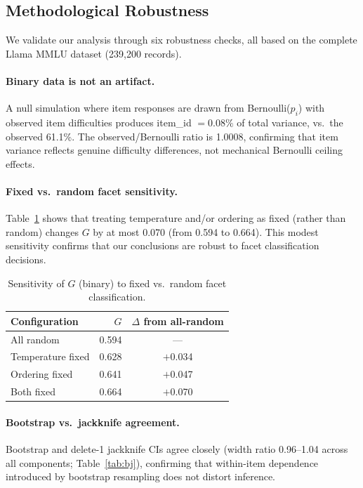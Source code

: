 \documentclass[letterpaper]{article}
\begin{document}
\subsection{Methodological Robustness}
\label{sec:robust}

We validate our analysis through six robustness checks, all based on the complete Llama MMLU dataset (239,200 records).

\paragraph{Binary data is not an artifact.}
A null simulation where item responses are drawn from Bernoulli($p_i$) with observed item difficulties produces item\_id $= 0.08\%$ of total variance, vs.\ the observed 61.1\%. The observed/Bernoulli ratio is 1.0008, confirming that item variance reflects genuine difficulty differences, not mechanical Bernoulli ceiling effects.

\paragraph{Fixed vs.\ random facet sensitivity.}
Table~\ref{tab:fixedrandom} shows that treating temperature and/or ordering as fixed (rather than random) changes $G$ by at most 0.070 (from 0.594 to 0.664). This modest sensitivity confirms that our conclusions are robust to facet classification decisions.

\begin{table}[t]
\centering
\caption{Sensitivity of $G$ (binary) to fixed vs.\ random facet classification.}
\label{tab:fixedrandom}
\small
\begin{tabular}{lrc}
\toprule
Configuration & $G$ & $\Delta$ from all-random \\
\midrule
All random & 0.594 & --- \\
Temperature fixed & 0.628 & $+$0.034 \\
Ordering fixed & 0.641 & $+$0.047 \\
Both fixed & 0.664 & $+$0.070 \\
\bottomrule
\end{tabular}
\end{table}

\paragraph{Bootstrap vs.\ jackknife agreement.}
Bootstrap and delete-1 jackknife CIs agree closely (width ratio 0.96--1.04 across all components; Table~\ref{tab:bj}), confirming that within-item dependence introduced by bootstrap resampling does not distort inference.
\end{document}
